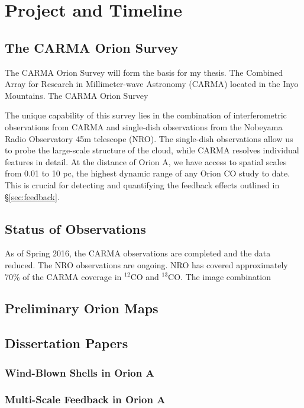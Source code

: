 \section{Project and Timeline}\label{sec:project}
    \subsection{The CARMA Orion Survey}\label{sec:carma}
    The CARMA Orion Survey will form the basis for my thesis. The Combined Array for Research in Millimeter-wave Astronomy (CARMA) located in the Inyo Mountains. The CARMA Orion Survey %
    
    The unique capability of this survey lies in the combination of interferometric observations from CARMA and single-dish observations from the Nobeyama Radio Observatory 45m telescope (NRO). The single-dish observations allow us to probe the large-scale structure of the cloud, while CARMA resolves individual features in detail. At the distance of Orion A, we have access to spatial scales from 0.01 to 10 pc, the highest dynamic range of any Orion CO study to date. This is crucial for detecting and quantifying the feedback effects outlined in \S\ref{sec:feedback}.
    \subsection{Status of Observations}\label{sec:status}
    As of Spring 2016, the CARMA observations are completed and the data reduced. The NRO observations are ongoing. NRO has covered approximately 70\% of the CARMA coverage in $^{12}$CO and $^{13}$CO. The image combination 
    \subsection{Preliminary Orion Maps}\label{sec:maps}
    
    
    \subsection{Dissertation Papers}\label{sec:papers}
        \subsubsection{Wind-Blown Shells in Orion A}\label{sec:paper1}
        \subsubsection{Multi-Scale Feedback in Orion A}\label{sec:paper2}
